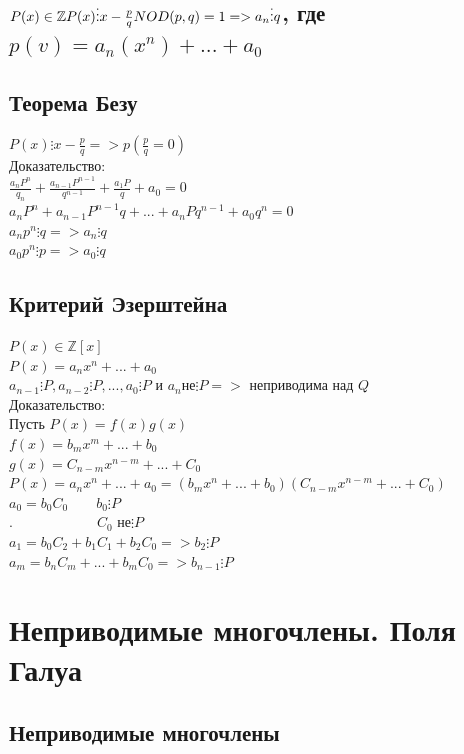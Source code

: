 \documentclass[12pt]{article}
\begin{document}
    \subsection{$P(x) \in\mathbb{Z} P(x)\vdots x - \frac{p}{q}\\NOD(p,q)=1 => a_n \vdots q $, где $p(v)=a_n(x^n)+...+a_0$}
    \subsection{Теорема Безу}
    \noindent $P(x) \vdots x - \frac{p}{q} => p(\frac{p}{q} = 0)$
    \\Доказательство:
    \\$\frac{a_nP^n}{q_n}+\frac{a_{n-1}P^{n-1}}{q^{n-1}}+\frac{a_1P}{q}+a_0=0$
        \\$a_nP^n+a_{n-1}P^{n-1}q+...+a_nPq^{n-1}+a_0q^n=0$
    \\$a_np^n \vdots q => a_n \vdots q$
        \\$a_0p^n \vdots p => a_0 \vdots q$
    \subsection{Критерий Эзерштейна}
    \noindent $P(x) \in \mathbb{Z}[x]$
    \\$P(x) = a_nx^n+...+a_0$
        \\$a_{n-1}\vdots P, a_{n-2} \vdots P,...,a_0\vdots P$ и $a_n$не$\vdots P=>$ неприводима над $Q$
    \\Доказательство:
    \\Пусть $P(x) = f(x)g(x)$
    \\$f(x) = b_mx^m+...+b_0$
        \\$g(x) = C_{n-m}x^{n-m}+...+C_0$
    \\$P(x) = a_nx^n+...+a_0=(b_mx^n+...+b_0)(C_{n-m}x^{n-m}+...+C_0)$
        \\$a_0=b_0C_0 \qquad b_0 \vdots P$
    \\$. \hspace{6em}C_0$ не$ \vdots P$
        \\$a_1=b_0C_2+b_1C_1+b_2C_0 => b_2\vdots P $
    \\$a_m=b_nC_m+...+b_mC_0 => b_{n-1}\vdots P $

        \setcounter{section}{12}
        \section{Неприводимые многочлены. Поля Галуа}
        \subsection{Неприводимые многочлены}
\end{document}
